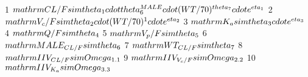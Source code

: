 \begin{Schunk}
\begin{Soutput}
1  $\\mathrm{CL/F  \\sim \\theta_{1}\\cdot  \\theta_{6}^{MALE}\\cdot (WT/70)^{\\theta_{7}}\\cdot e^{\\eta_{1}}}$
2                                   $\\mathrm{V_{c}/F  \\sim \\theta_{2}\\cdot (WT/70)^{1}\\cdot e^{\\eta_{2}}}$
3                                                        $\\mathrm{K_{a} \\sim \\theta_{3}\\cdot e^{\\eta_{3}}}$
4                                                                             $\\mathrm{Q/F  \\sim \\theta_{4}}$
5                                                                         $\\mathrm{V_{p}/F  \\sim \\theta_{5}}$
6                                                                       $\\mathrm{MALE_{CL/F}\\sim \\theta_{6}}$
7                                                                         $\\mathrm{WT_{CL/F}\\sim \\theta_{7}}$
8                                                                      $\\mathrm{IIV_{CL/F}\\sim \\Omega_{1.1}}$
9                                                                   $\\mathrm{IIV_{V_{c}/F}\\sim \\Omega_{2.2}}$
10                                                                    $\\mathrm{IIV_{K_{a}}\\sim \\Omega_{3.3}}$

\end{Soutput}
\end{Schunk}
